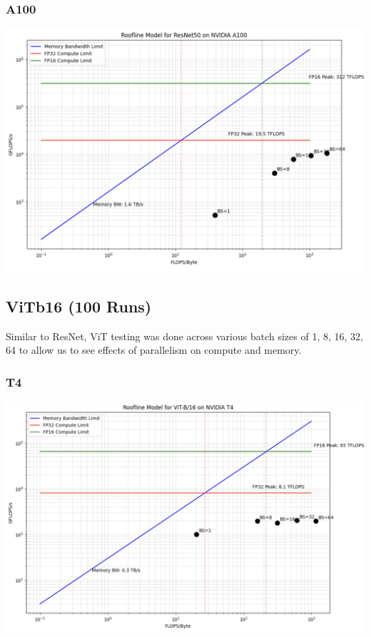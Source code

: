 \documentclass[11pt]{article}
\begin{document}
\subsubsection*{A100}
\includegraphics[width=14cm]{resnet/resnet_a100.png}


\subsection*{ViTb16 (100 Runs)}
Similar to ResNet, ViT testing was done across various batch sizes of 1, 8, 16, 32, 64 to allow us to see effects of parallelism on compute and memory.
\subsubsection*{T4}
\includegraphics[width=14cm]{vit/vit_t4.png}
\end{document}
